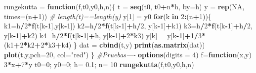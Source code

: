 \documentclass[]{article}
\newenvironment{Shaded}{\begin{snugshade}}{\end{snugshade}}
\newcommand{\KeywordTok}[1]{\textcolor[rgb]{0.13,0.29,0.53}{\textbf{#1}}}
\newcommand{\DataTypeTok}[1]{\textcolor[rgb]{0.13,0.29,0.53}{#1}}
\newcommand{\DecValTok}[1]{\textcolor[rgb]{0.00,0.00,0.81}{#1}}
\newcommand{\FloatTok}[1]{\textcolor[rgb]{0.00,0.00,0.81}{#1}}
\newcommand{\StringTok}[1]{\textcolor[rgb]{0.31,0.60,0.02}{#1}}
\newcommand{\CommentTok}[1]{\textcolor[rgb]{0.56,0.35,0.01}{\textit{#1}}}
\newcommand{\OtherTok}[1]{\textcolor[rgb]{0.56,0.35,0.01}{#1}}
\newcommand{\ControlFlowTok}[1]{\textcolor[rgb]{0.13,0.29,0.53}{\textbf{#1}}}
\newcommand{\OperatorTok}[1]{\textcolor[rgb]{0.81,0.36,0.00}{\textbf{#1}}}
\newcommand{\NormalTok}[1]{#1}
\begin{document}
\begin{Shaded}
\begin{Highlighting}[]
\NormalTok{rungekutta =}\StringTok{ }\ControlFlowTok{function}\NormalTok{(f,t0,y0,h,n)\{}
\NormalTok{t =}\StringTok{ }\KeywordTok{seq}\NormalTok{(t0, t0}\OperatorTok{+}\NormalTok{n}\OperatorTok{*}\NormalTok{h, }\DataTypeTok{by=}\NormalTok{h)}
\NormalTok{y =}\StringTok{ }\KeywordTok{rep}\NormalTok{(}\OtherTok{NA}\NormalTok{, }\DataTypeTok{times=}\NormalTok{(n}\OperatorTok{+}\DecValTok{1}\NormalTok{))}
\CommentTok{# length(t)==length(y)}
\NormalTok{y[}\DecValTok{1}\NormalTok{] =}\StringTok{ }\NormalTok{y0}
\ControlFlowTok{for}\NormalTok{(k }\ControlFlowTok{in} \DecValTok{2}\OperatorTok{:}\NormalTok{(n}\OperatorTok{+}\DecValTok{1}\NormalTok{))\{}
\NormalTok{  k1=h}\OperatorTok{/}\DecValTok{2}\OperatorTok{*}\KeywordTok{f}\NormalTok{(t[k}\OperatorTok{-}\DecValTok{1}\NormalTok{],y[k}\OperatorTok{-}\DecValTok{1}\NormalTok{])}
\NormalTok{  k2=h}\OperatorTok{/}\DecValTok{2}\OperatorTok{*}\KeywordTok{f}\NormalTok{(t[k}\OperatorTok{-}\DecValTok{1}\NormalTok{]}\OperatorTok{+}\NormalTok{h}\OperatorTok{/}\DecValTok{2}\NormalTok{, y[k}\OperatorTok{-}\DecValTok{1}\NormalTok{]}\OperatorTok{+}\NormalTok{k1)}
\NormalTok{  k3=h}\OperatorTok{/}\DecValTok{2}\OperatorTok{*}\KeywordTok{f}\NormalTok{(t[k}\OperatorTok{-}\DecValTok{1}\NormalTok{]}\OperatorTok{+}\NormalTok{h}\OperatorTok{/}\DecValTok{2}\NormalTok{, y[k}\OperatorTok{-}\DecValTok{1}\NormalTok{]}\OperatorTok{+}\NormalTok{k2)}
\NormalTok{  k4=h}\OperatorTok{/}\DecValTok{2}\OperatorTok{*}\KeywordTok{f}\NormalTok{(t[k}\OperatorTok{-}\DecValTok{1}\NormalTok{]}\OperatorTok{+}\NormalTok{h, y[k}\OperatorTok{-}\DecValTok{1}\NormalTok{]}\OperatorTok{+}\DecValTok{2}\OperatorTok{*}\NormalTok{k3)}
\NormalTok{  y[k] =}\StringTok{ }\NormalTok{y[k}\OperatorTok{-}\DecValTok{1}\NormalTok{]}\OperatorTok{+}\DecValTok{1}\OperatorTok{/}\DecValTok{3}\OperatorTok{*}\NormalTok{(k1}\OperatorTok{+}\DecValTok{2}\OperatorTok{*}\NormalTok{k2}\OperatorTok{+}\DecValTok{2}\OperatorTok{*}\NormalTok{k3}\OperatorTok{+}\NormalTok{k4)}
\NormalTok{\}}
\NormalTok{dat =}\StringTok{ }\KeywordTok{cbind}\NormalTok{(t,y)}
\KeywordTok{print}\NormalTok{(}\KeywordTok{as.matrix}\NormalTok{(dat))}
 \KeywordTok{plot}\NormalTok{(t,y,}\DataTypeTok{pch=}\DecValTok{20}\NormalTok{, }\DataTypeTok{col=}\StringTok{"red"}\NormalTok{)}
\NormalTok{\}}
\CommentTok{#Pruebas----}
\KeywordTok{options}\NormalTok{(}\DataTypeTok{digits =} \DecValTok{4}\NormalTok{) }
\NormalTok{f=}\ControlFlowTok{function}\NormalTok{(x,y) }\DecValTok{3}\OperatorTok{*}\NormalTok{x}\OperatorTok{+}\DecValTok{7}\OperatorTok{*}\NormalTok{y}
\NormalTok{t0=}\DecValTok{0}\NormalTok{; y0=}\DecValTok{0}\NormalTok{; h=}\StringTok{ }\FloatTok{0.1}\NormalTok{; n=}\StringTok{ }\DecValTok{10} 
\KeywordTok{rungekutta}\NormalTok{(f,t0,y0,h,n)}
\end{Highlighting}
\end{Shaded}
\end{document}
